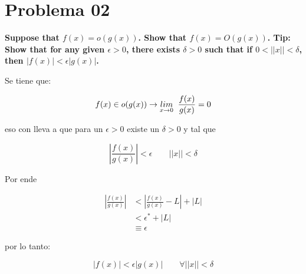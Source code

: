 \section*{Problema 02}

\textbf{Suppose that $f(x)=o(g(x))$. Show that $f(x) = O(g(x))$. Tip: Show that for any given $\epsilon > 0$, there exists $\delta> 0$ such that if $0 < ||x||< \delta$, then $|f(x)|< \epsilon|g(x)|$.}

Se tiene que:

\begin{equation*}
    f(x) \in o(g(x)) \rightarrow \underset{x \rightarrow 0}{lim} \;\; \frac{f(x)}{g(x)} =0
\end{equation*}

eso con lleva a que para un $\epsilon > 0 $ existe un $\delta > 0 $ y tal que

\begin{equation*}
    \left|\frac{f(x)}{g(x)} \right| < \epsilon  \qquad ||x||< \delta
\end{equation*}

Por ende

\begin{align*}
    \left|\frac{f(x)}{g(x)} \right| & < \left|\frac{f(x)}{g(x)} - L\right| + |L| \\
                                    & < \epsilon^* + |L|                         \\
                                    & \equiv \epsilon
\end{align*}

por lo tanto:

\begin{equation*}
    |f(x)| < \epsilon |g(x)|  \qquad \forall ||x|| < \delta
\end{equation*}
